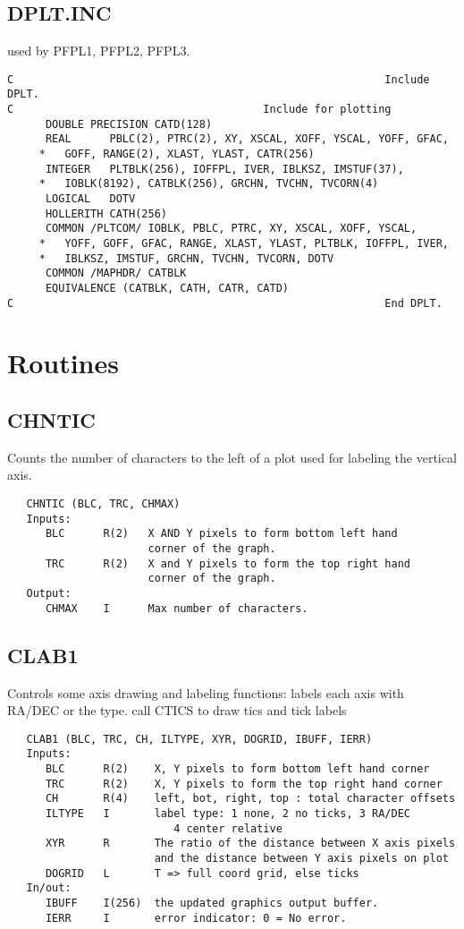 \subsection{DPLT.INC}
used by PFPL1, PFPL2, PFPL3.

\begin{verbatim}
C                                                          Include DPLT.
C                                       Include for plotting
      DOUBLE PRECISION CATD(128)
      REAL      PBLC(2), PTRC(2), XY, XSCAL, XOFF, YSCAL, YOFF, GFAC,
     *   GOFF, RANGE(2), XLAST, YLAST, CATR(256)
      INTEGER   PLTBLK(256), IOFFPL, IVER, IBLKSZ, IMSTUF(37),
     *   IOBLK(8192), CATBLK(256), GRCHN, TVCHN, TVCORN(4)
      LOGICAL   DOTV
      HOLLERITH CATH(256)
      COMMON /PLTCOM/ IOBLK, PBLC, PTRC, XY, XSCAL, XOFF, YSCAL,
     *   YOFF, GOFF, GFAC, RANGE, XLAST, YLAST, PLTBLK, IOFFPL, IVER,
     *   IBLKSZ, IMSTUF, GRCHN, TVCHN, TVCORN, DOTV
      COMMON /MAPHDR/ CATBLK
      EQUIVALENCE (CATBLK, CATH, CATR, CATD)
C                                                          End DPLT.
\end{verbatim}

\section{Routines}

\subsection{CHNTIC}
Counts the number of characters to the left of a plot used
for labeling the vertical axis.
\begin{verbatim}
   CHNTIC (BLC, TRC, CHMAX)
   Inputs:
      BLC      R(2)   X AND Y pixels to form bottom left hand
                      corner of the graph.
      TRC      R(2)   X and Y pixels to form the top right hand
                      corner of the graph.
   Output:
      CHMAX    I      Max number of characters.
\end{verbatim}

\subsection{CLAB1}
Controls some axis drawing and labeling functions:
labels each axis with RA/DEC or the type.
call CTICS to draw tics and tick labels
\begin{verbatim}
   CLAB1 (BLC, TRC, CH, ILTYPE, XYR, DOGRID, IBUFF, IERR)
   Inputs:
      BLC      R(2)    X, Y pixels to form bottom left hand corner
      TRC      R(2)    X, Y pixels to form the top right hand corner
      CH       R(4)    left, bot, right, top : total character offsets
      ILTYPE   I       label type: 1 none, 2 no ticks, 3 RA/DEC
                          4 center relative
      XYR      R       The ratio of the distance between X axis pixels
                       and the distance between Y axis pixels on plot
      DOGRID   L       T => full coord grid, else ticks
   In/out:
      IBUFF    I(256)  the updated graphics output buffer.
      IERR     I       error indicator: 0 = No error.
\end{verbatim}

